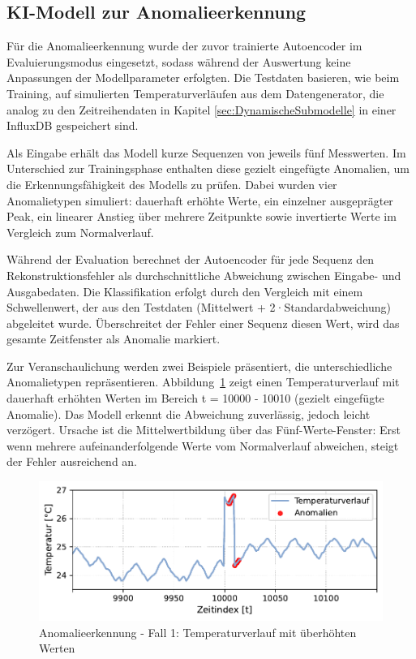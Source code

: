 \newpage
\subsection{KI-Modell zur Anomalieerkennung}

Für die Anomalieerkennung wurde der zuvor trainierte Autoencoder im Evaluierungsmodus eingesetzt, sodass während der Auswertung keine Anpassungen der Modellparameter erfolgten.
Die Testdaten basieren, wie beim Training, auf simulierten Temperaturverläufen aus dem Datengenerator, die analog zu den Zeitreihendaten in Kapitel \ref{sec:DynamischeSubmodelle} in einer InfluxDB gespeichert sind.

Als Eingabe erhält das Modell kurze Sequenzen von jeweils fünf Messwerten.
Im Unterschied zur Trainingsphase enthalten diese gezielt eingefügte Anomalien, um die Erkennungsfähigkeit des Modells zu prüfen.
Dabei wurden vier Anomalietypen simuliert: dauerhaft erhöhte Werte, ein einzelner ausgeprägter Peak, ein linearer Anstieg über mehrere Zeitpunkte sowie invertierte Werte im Vergleich zum Normalverlauf.

Während der Evaluation berechnet der Autoencoder für jede Sequenz den Rekonstruktionsfehler als durchschnittliche Abweichung zwischen Eingabe- und Ausgabedaten. 
Die Klassifikation erfolgt durch den Vergleich mit einem Schwellenwert, der aus den Testdaten (Mittelwert + 2·Standardabweichung) abgeleitet wurde.
Überschreitet der Fehler einer Sequenz diesen Wert, wird das gesamte Zeitfenster als Anomalie markiert.

Zur Veranschaulichung werden zwei Beispiele präsentiert, die unterschiedliche Anomalietypen repräsentieren.
Abbildung~\ref{fig:Fall1} zeigt einen Temperaturverlauf mit dauerhaft erhöhten Werten im Bereich t = 10000 - 10010 (gezielt eingefügte Anomalie). 
Das Modell erkennt die Abweichung zuverlässig, jedoch leicht verzögert. 
Ursache ist die Mittelwertbildung über das Fünf-Werte-Fenster: Erst wenn mehrere aufeinanderfolgende Werte vom Normalverlauf abweichen, steigt der Fehler ausreichend an.


\vspace{-0.75em}
\begin{figure}[htbp]
    \centering
        \includegraphics[width=1\textwidth]{Bilder/Ergebnisse/KI/Fall1.pdf}
        \vspace{-2em}
    \caption[Anomalieerkennung - Fall 1]{Anomalieerkennung - Fall 1: Temperaturverlauf mit überhöhten Werten}
    \label{fig:Fall1}
\end{figure}
\vspace{-0.5em}

